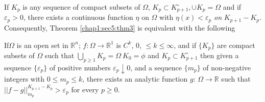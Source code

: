 If $ K_p$ is any sequence of compact subsets of $\Omega$, $K_p \subset
K^\circ_{ p+1}, \cup K_p = \Omega$ and if $\varepsilon_p>0$, there exists a
continuous function $\eta$ on $\Omega$ with $\eta (x) < \varepsilon
_p$ \textit{on} $K_{ p +1} - K_p$. Consequently,
Theorem \ref{chap1:sec5:thm3} is
equivalent with the following  

\begin{theorem*}[{\boldmath $3'$}]\label{chap1:sec5:thm3'}%
  If\pageoriginale $\Omega$ is an open set in $\mathbb{R}^n$; $f: \Omega \to
  \mathbb{R}^1$ is $C^k$, $0$, $\leq k \leq \infty$, and if $\{K_p\}$
  are compact subsets of $\Omega$ such that $\bigcup\limits_{ p \geq
    1} K_p = \Omega~ K_0 = \phi$  and $K_p \subset {K}^\circ_{p +1}$ then given a
  sequence $\{\varepsilon _p\}$ of positive numbers $\varepsilon_p
  \downarrow 0$, and a sequence $\{m_p\}$ of non-negative integers
  with $0 \leq m_p \leq k$, there exists an analytic function $g$:
  $\Omega \to \mathbb{R}$ such that $|| f - g || ^{ K_{ p +1} -
    K_p}_{ m_p}> \varepsilon_p$ for every $p \geq 0$.  
\end{theorem*}


